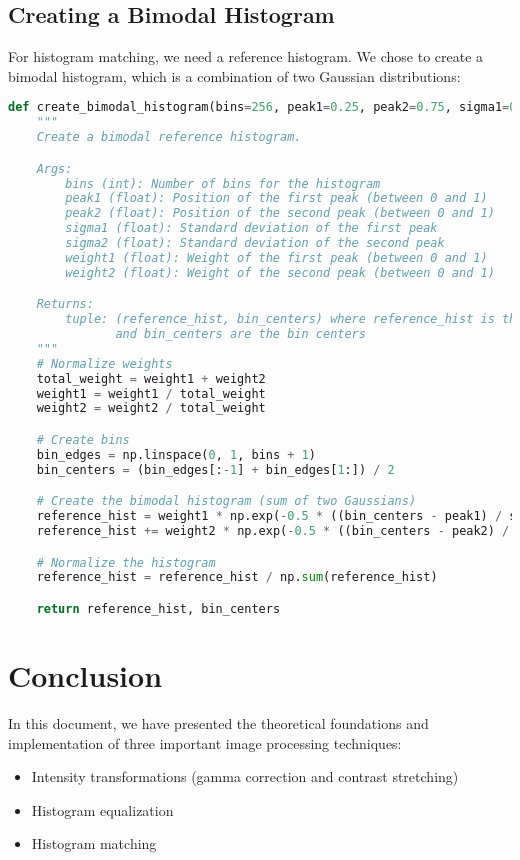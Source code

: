 \documentclass[12pt,a4paper]{article}
\begin{document}
\subsection{Creating a Bimodal Histogram}

For histogram matching, we need a reference histogram. We chose to create a bimodal histogram, which is a combination of two Gaussian distributions:

\begin{lstlisting}[language=Python, caption=Creating a bimodal histogram]
def create_bimodal_histogram(bins=256, peak1=0.25, peak2=0.75, sigma1=0.05, sigma2=0.05, weight1=0.5, weight2=0.5):
    """
    Create a bimodal reference histogram.

    Args:
        bins (int): Number of bins for the histogram
        peak1 (float): Position of the first peak (between 0 and 1)
        peak2 (float): Position of the second peak (between 0 and 1)
        sigma1 (float): Standard deviation of the first peak
        sigma2 (float): Standard deviation of the second peak
        weight1 (float): Weight of the first peak (between 0 and 1)
        weight2 (float): Weight of the second peak (between 0 and 1)

    Returns:
        tuple: (reference_hist, bin_centers) where reference_hist is the bimodal histogram
               and bin_centers are the bin centers
    """
    # Normalize weights
    total_weight = weight1 + weight2
    weight1 = weight1 / total_weight
    weight2 = weight2 / total_weight

    # Create bins
    bin_edges = np.linspace(0, 1, bins + 1)
    bin_centers = (bin_edges[:-1] + bin_edges[1:]) / 2

    # Create the bimodal histogram (sum of two Gaussians)
    reference_hist = weight1 * np.exp(-0.5 * ((bin_centers - peak1) / sigma1) ** 2) / (sigma1 * np.sqrt(2 * np.pi))
    reference_hist += weight2 * np.exp(-0.5 * ((bin_centers - peak2) / sigma2) ** 2) / (sigma2 * np.sqrt(2 * np.pi))

    # Normalize the histogram
    reference_hist = reference_hist / np.sum(reference_hist)

    return reference_hist, bin_centers
\end{lstlisting}

\section{Conclusion}

In this document, we have presented the theoretical foundations and implementation of three important image processing techniques:
\begin{itemize}
    \item Intensity transformations (gamma correction and contrast stretching)
    \item Histogram equalization
    \item Histogram matching
\end{itemize}
\end{document}
